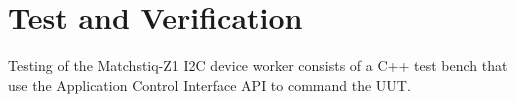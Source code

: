 \section*{Test and Verification}
Testing of the Matchstiq-Z1 I2C device worker consists of a C++ test bench that use the Application Control Interface API to command the UUT.


